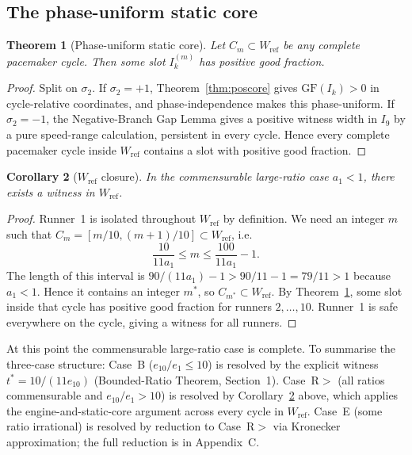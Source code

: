 \documentclass[12pt,a4paper]{amsart}
\newtheorem{theorem}{Theorem}[section]
\newtheorem{corollary}[theorem]{Corollary}
\theoremstyle{definition}
\theoremstyle{remark}
\newcommand{\GF}{\mathrm{GF}}
\newcommand{\Wref}{W_{\mathrm{ref}}}
\begin{document}
\subsection{The phase-uniform static core}

\begin{theorem}[Phase-uniform static core]\label{thm:phasecore}
Let $C_m\subset\Wref$ be any complete pacemaker cycle. Then some slot $I_k^{(m)}$ has
positive good fraction.
\end{theorem}

\begin{proof}
Split on $\sigma_2$. If $\sigma_2=+1$, Theorem~\ref{thm:poscore} gives $\GF(I_k)>0$ in
cycle-relative coordinates, and phase-independence makes this phase-uniform. If
$\sigma_2=-1$, the Negative-Branch Gap Lemma gives a positive witness width in $I_9$ by
a pure speed-range calculation, persistent in every cycle. Hence every complete pacemaker
cycle inside $\Wref$ contains a slot with positive good fraction.
\end{proof}

\begin{corollary}[$\Wref$ closure]\label{cor:wref}
In the commensurable large-ratio case $a_1<1$, there exists a witness in $\Wref$.
\end{corollary}

\begin{proof}
Runner~1 is isolated throughout $\Wref$ by definition. We need an integer $m$ such that
$C_m=[m/10,(m+1)/10]\subset\Wref$, i.e.\
\[
  \frac{10}{11a_1} \le m \le \frac{100}{11a_1}-1.
\]
The length of this interval is $90/(11a_1)-1>90/11-1=79/11>1$ because $a_1<1$. Hence it
contains an integer $m^*$, so $C_{m^*}\subset\Wref$. By Theorem~\ref{thm:phasecore},
some slot inside that cycle has positive good fraction for runners $2,\ldots,10$. Runner~1
is safe everywhere on the cycle, giving a witness for all runners.
\end{proof}

At this point the commensurable large-ratio case is complete. To summarise the three-case
structure: Case~B ($e_{10}/e_1\le 10$) is resolved by the explicit witness $t^*=10/(11e_{10})$
(Bounded-Ratio Theorem, Section~1). Case~R$>$ (all ratios commensurable and $e_{10}/e_1>10$)
is resolved by Corollary~\ref{cor:wref} above, which applies the engine-and-static-core
argument across every cycle in $\Wref$. Case~E (some ratio irrational) is resolved by
reduction to Case~R$>$ via Kronecker approximation; the full reduction is in Appendix~C.
\end{document}
